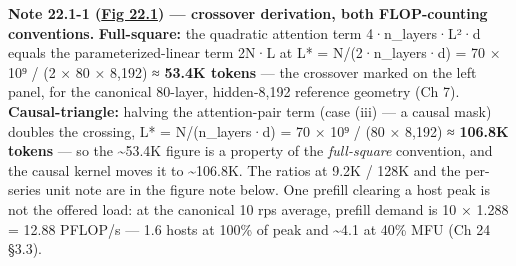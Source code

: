 \textbf{Note 22.1-1 (\hyperref[fig:22.1]{Fig 22.1}) --- crossover derivation, both
FLOP-counting conventions.} \textbf{Full-square:} the quadratic
attention term 4·n\_layers·L²·d equals the parameterized-linear term
2N·L at L* = N/(2·n\_layers·d) = 70 × 10⁹ / (2 × 80 × 8,192) ≈
\textbf{53.4K tokens} --- the crossover marked on the left panel, for
the canonical 80-layer, hidden-8,192 reference geometry (Ch 7).
\textbf{Causal-triangle:} halving the attention-pair term (case (iii)
--- a causal mask) doubles the crossing, L* = N/(n\_layers·d) = 70 × 10⁹
/ (80 × 8,192) ≈ \textbf{106.8K tokens} --- so the \textasciitilde53.4K
figure is a property of the \emph{full-square} convention, and the
causal kernel moves it to \textasciitilde106.8K. The ratios at 9.2K /
128K and the per-series unit note are in the figure note below. One
prefill clearing a host peak is not the offered load: at the canonical
10 rps average, prefill demand is 10 × 1.288 = 12.88 PFLOP/s --- 1.6
hosts at 100\% of peak and \textasciitilde4.1 at 40\% MFU (Ch 24 §3.3).

